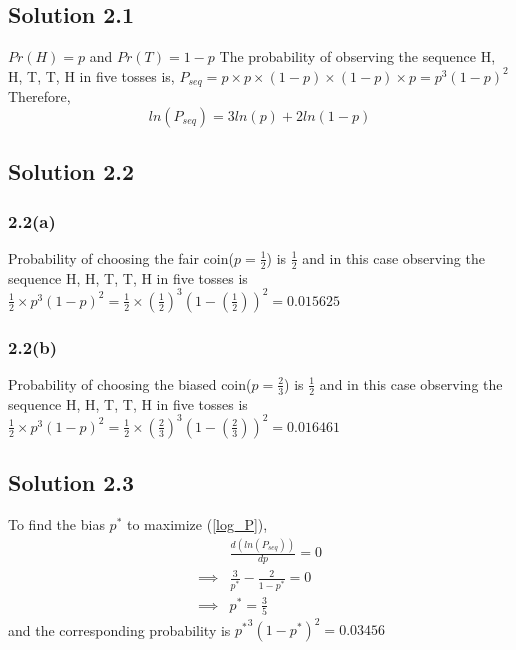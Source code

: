 \subsection*{Solution 2.1}
$Pr(H) = p$ and $Pr(T) = 1-p$
\newline
The probability of observing the sequence H, H, T, T, H in five tosses is, $P_{seq} = p\times p \times (1-p) \times (1-p) \times p = p^3(1-p)^2$
Therefore,
\begin{equation}
\label{log_P}
	ln(P_{seq}) = 3ln(p) + 2ln(1-p)
\end{equation}

\subsection*{Solution 2.2}
\subsubsection*{2.2(a)}
Probability of choosing the fair coin($p=\frac{1}{2}$) is $\frac{1}{2}$ and in this case observing the sequence H, H, T, T, H in five tosses is $\frac{1}{2} \times p^3(1-p)^2 = \frac{1}{2} \times (\frac{1}{2})^3(1-(\frac{1}{2}))^2 = 0.015625$ 
\subsubsection*{2.2(b)}
Probability of choosing the biased coin($p=\frac{2}{3}$) is $\frac{1}{2}$ and in this case observing the sequence H, H, T, T, H in five tosses is $\frac{1}{2} \times p^3(1-p)^2 = \frac{1}{2} \times (\frac{2}{3})^3(1-(\frac{2}{3}))^2 = 0.016461$ 
\subsection*{Solution 2.3}
To find the bias $p^*$ to maximize (\ref{log_P}),
\begin{equation}
	\begin{split}
					& \frac{d(ln(P_{seq}))}{dp} = 0\\
		\implies	& \frac{3}{p^*} - \frac{2}{1-p^*} = 0\\
		\implies	& p^* = \frac{3}{5}
	\end{split}
\end{equation}
and the corresponding probability is ${p^*}^3(1-p^*)^2 = 0.03456$